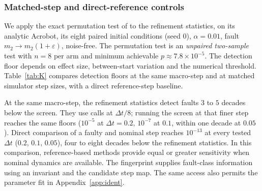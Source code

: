 \documentclass[10pt]{article}
\theoremstyle{definition}
\newcommand{\fittable}[2][\linewidth]{%
  \sbox{\tablebox}{#2}%
  \ifdim\wd\tablebox>#1\relax
    \resizebox{#1}{!}{\usebox{\tablebox}}%
  \else
    \usebox{\tablebox}%
  \fi}
\begin{document}
\begin{table}[htbp]
\centering\small
\fittable{}
\caption{Distinct classifier outcomes in selected existing experiments.
Order mismatch counts order-$k$ with $k\ne q$; order-$q$ is the fallback
without estimated mismatch. The dynamics integrated by midpoint conserve
the specified energy, so its model labels are erroneous attributions.
Euler plus a mass fault illustrates masking: an order flag
does not imply correct model-fault attribution. Coverage includes erroneous
labels. Each Acrobot row uses $40$ starts, reused across timesteps within
its experiment; transfer counts are $1440$ evaluations of $120$ starts.}
\label{tab:diagnostic-outcomes}
\end{table}

\subsubsection{Matched-step and direct-reference controls}\label{sec:exp:K}

We apply the exact permutation test of \citet{gebrekidan2026diagnosing} to the refinement statistics, on its
analytic Acrobot, its eight paired initial conditions (seed $0$), $\alpha=0.01$, fault $m_2\to m_2(1+\varepsilon)$, noise-free. The permutation test is an \emph{unpaired two-sample} test with
$n=8$ per arm and minimum achievable $p\approx7.8\times10^{-5}$. The
detection floor depends on effect size, between-start variation and the
numerical threshold.
Table~\ref{tab:K} compares detection floors at the same macro-step and at
matched simulator step sizes, with a direct reference-step baseline.

\begin{table}[htbp]
\centering\small
\fittable{}
\caption{Detection floors (relative $m_2$ error), same permutation test and initial conditions. The screen's absolute
floor $10^{-8}$ is shown (a float64-level floor $10^{-14}$ changes only the $\Delta t=0.005$ entry, $10^{-9}$). Horizons are
$10$~s for $\Delta t\ge0.05$, $4$~s at $0.01$ and $2$~s at $0.005$. Floors at $\Delta t=0.01,0.005$ are censored at the grid
minimum $10^{-12}$. ``Direct step compare'': largest state difference between the faulty and nominal simulator after one step
exceeds $10^{-14}$.}
\label{tab:K}
\end{table}

At the same macro-step, the refinement statistics detect faults $3$ to $5$
decades below the screen. They use calls at $\Delta t/8$; running the screen
at that finer step reaches the same floors ($10^{-5}$ at $\Delta t=0.2$,
$10^{-7}$ at $0.1$, within one decade at $0.05$). Direct comparison of a
faulty and nominal step reaches $10^{-13}$ at every tested $\Delta t$
($0.2$, $0.1$, $0.05$), four to eight decades below the refinement statistics.
In this comparison, reference-based methods provide equal or greater
sensitivity when nominal dynamics are available. The fingerprint supplies fault-class
information using an invariant and the candidate step map. The same access
also permits the parameter fit in Appendix~\ref{app:ident}.
\end{document}
